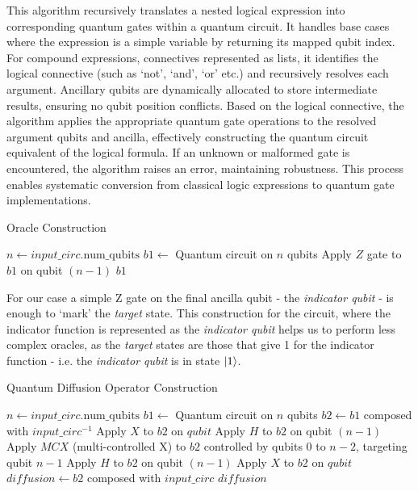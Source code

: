 \documentclass[encoding=utf8,british]{tumphthesis}
\begin{document}
    This algorithm recursively translates a nested logical expression into corresponding quantum gates within a quantum circuit. It handles base 
    cases where the expression is a simple variable by returning its mapped qubit index. For compound expressions, connectives represented as lists, it identifies 
    the logical connective (such as `not', `and', `or' etc.) and recursively resolves each argument. Ancillary qubits are dynamically allocated to 
    store intermediate results, ensuring no qubit position conflicts. Based on the logical connective, the algorithm applies the appropriate quantum 
    gate operations to the resolved argument qubits and ancilla, effectively constructing the quantum circuit equivalent of the logical formula. If 
    an unknown or malformed gate is encountered, the algorithm raises an error, maintaining robustness. This process enables systematic conversion 
    from classical logic expressions to quantum gate implementations.

    \begin{algorithm}[H]
    \caption{Oracle Construction}
    \label{alg:oracle1}
    \begin{algorithmic}[3]
        \State $n \gets input\_circ.\text{num\_qubits}$
        \State $b1 \gets$ Quantum circuit on $n$ qubits
        \State Apply $Z$ gate to $b1$ on qubit $(n-1)$
        \State \Return $b1$
    \EndFunction
    \end{algorithmic}
    \end{algorithm}

    For our case a simple Z gate on the final ancilla qubit - the \textit{indicator qubit} - is enough to `mark' the \textit{target} state. This construction for the circuit, where the indicator function
    is represented as the \textit{indicator qubit} helps us to perform less complex oracles, as the \textit{target} states are those that give 1 for the indicator function - i.e. the \textit{indicator qubit} is in state $\left|1\right>$. 

    \begin{algorithm}[H]
    \caption{Quantum Diffusion Operator Construction}
    \label{alg:diffusion}
    \begin{algorithmic}[4]
        \State $n \gets input\_circ.\text{num\_qubits}$
        \State $b1 \gets$ Quantum circuit on $n$ qubits
        \State $b2 \gets b1$ composed with $input\_circ^{-1}$
            \State Apply $X$ to $b2$ on $qubit$
        \EndFor
        \State Apply $H$ to $b2$ on qubit $(n-1)$
        \State Apply $MCX$ (multi-controlled X) to $b2$ controlled by qubits $0$ to $n-2$, targeting qubit $n-1$
        \State Apply $H$ to $b2$ on qubit $(n-1)$
            \State Apply $X$ to $b2$ on $qubit$
        \EndFor
        \State $diffusion \gets b2$ composed with $input\_circ$
        \State \Return $diffusion$
    \EndFunction
    \end{algorithmic}
    \end{algorithm}
\end{document}
